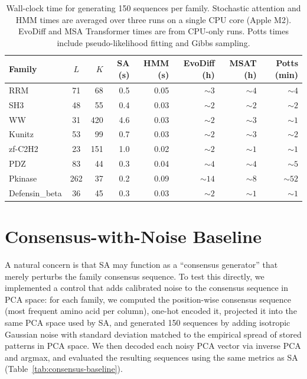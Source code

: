 \documentclass[10pt]{article}
\begin{document}
\begin{table}[ht]
\centering
\small
\caption{Wall-clock time for generating 150 sequences per family. Stochastic attention and HMM times are averaged over three runs on a single CPU core (Apple M2). EvoDiff and MSA Transformer times are from CPU-only runs. Potts times include pseudo-likelihood fitting and Gibbs sampling.}
\label{tab:timing}
\begin{tabular}{@{}lcrrrrrr@{}}
\toprule
Family & $L$ & $K$ & SA (s) & HMM (s) & EvoDiff (h) & MSAT (h) & Potts (min) \\
\midrule
RRM            & 71  & 68  & 0.5  & 0.05 & ${\sim}3$   & ${\sim}4$   & ${\sim}4$ \\
SH3            & 48  & 55  & 0.4  & 0.03 & ${\sim}2$   & ${\sim}2$   & ${\sim}2$ \\
WW             & 31  & 420 & 4.6  & 0.03 & ${\sim}2$   & ${\sim}3$   & ${\sim}1$ \\
Kunitz         & 53  & 99  & 0.7  & 0.03 & ${\sim}2$   & ${\sim}3$   & ${\sim}2$ \\
zf-C2H2        & 23  & 151 & 1.0  & 0.02 & ${\sim}2$   & ${\sim}1$   & ${\sim}1$ \\
PDZ            & 83  & 44  & 0.3  & 0.04 & ${\sim}4$   & ${\sim}4$   & ${\sim}5$ \\
Pkinase        & 262 & 37  & 0.2  & 0.09 & ${\sim}14$  & ${\sim}8$   & ${\sim}52$ \\
Defensin\_beta & 36  & 45  & 0.3  & 0.03 & ${\sim}2$   & ${\sim}1$   & ${\sim}1$ \\
\bottomrule
\end{tabular}
\end{table}

\section{Consensus-with-Noise Baseline}\label{si:consensus-baseline}

A natural concern is that SA may function as a ``consensus generator'' that merely perturbs the family consensus sequence. To test this directly, we implemented a control that adds calibrated noise to the consensus sequence in PCA space: for each family, we computed the position-wise consensus sequence (most frequent amino acid per column), one-hot encoded it, projected it into the same PCA space used by SA, and generated 150 sequences by adding isotropic Gaussian noise with standard deviation matched to the empirical spread of stored patterns in PCA space. We then decoded each noisy PCA vector via inverse PCA and argmax, and evaluated the resulting sequences using the same metrics as SA (Table~\ref{tab:consensus-baseline}).
\end{document}
